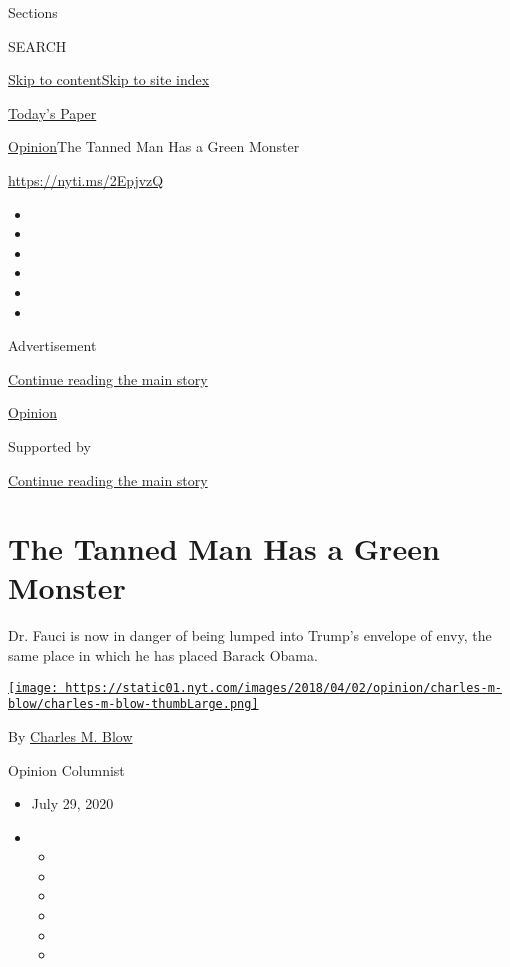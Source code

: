Sections

SEARCH

\protect\hyperlink{site-content}{Skip to
content}\protect\hyperlink{site-index}{Skip to site index}

\href{https://myaccount.nytimes.com/auth/login?response_type=cookie\&client_id=vi}{}

\href{https://www.nytimes.com/section/todayspaper}{Today's Paper}

\href{/section/opinion}{Opinion}\textbar{}The Tanned Man Has a Green
Monster

\href{https://nyti.ms/2EpjvzQ}{https://nyti.ms/2EpjvzQ}

\begin{itemize}
\item
\item
\item
\item
\item
\item
\end{itemize}

Advertisement

\protect\hyperlink{after-top}{Continue reading the main story}

\href{/section/opinion}{Opinion}

Supported by

\protect\hyperlink{after-sponsor}{Continue reading the main story}

\hypertarget{the-tanned-man-has-a-green-monster}{%
\section{The Tanned Man Has a Green
Monster}\label{the-tanned-man-has-a-green-monster}}

Dr. Fauci is now in danger of being lumped into Trump's envelope of
envy, the same place in which he has placed Barack Obama.

\href{https://www.nytimes.com/by/charles-m-blow}{\texttt{[image: https://static01.nyt.com/images/2018/04/02/opinion/charles-m-blow/charles-m-blow-thumbLarge.png]}}

By \href{https://www.nytimes.com/by/charles-m-blow}{Charles M. Blow}

Opinion Columnist

\begin{itemize}
\item
  July 29, 2020
\item
  \begin{itemize}
  \item
  \item
  \item
  \item
  \item
  \item
  \end{itemize}
\end{itemize}

